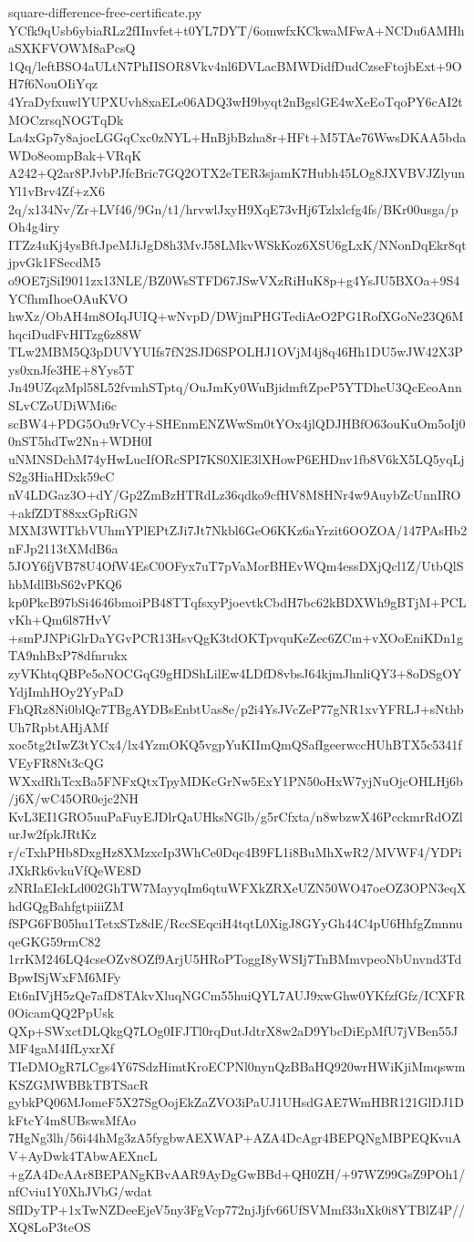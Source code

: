 \documentclass[11pt]{article}
\theoremstyle{definition}
\theoremstyle{remark}
\begin{document}
\begin{filecontents*}[overwrite]{square-difference-free-certificate.py}
YCfk9qUsb6ybiaRLz2fIInvfet+t0YL7DYT/6omwfxKCkwaMFwA+NCDu6AMHhaSXKFVOWM8aPcsQ
1Qq/leftBSO4aULtN7PhIISOR8Vkv4nl6DVLacBMWDidfDudCzseFtojbExt+9OH7f6NouOIiYqz
4YraDyfxuwlYUPXUvh8xaELe06ADQ3wH9byqt2nBgslGE4wXeEoTqoPY6cAI2tMOCzrsqNOGTqDk
La4xGp7y8ajocLGGqCxc0zNYL+HnBjbBzha8r+HFt+M5TAe76WwsDKAA5bdaWDo8eompBak+VRqK
A242+Q2ar8PJvbPJfcBric7GQ2OTX2eTER3sjamK7Hubh45LOg8JXVBVJZlyunYl1vBrv4Zf+zX6
2q/x134Nv/Zr+LVf46/9Gn/t1/hrvwlJxyH9XqE73vHj6Tzlxlcfg4fs/BKr00usga/pOh4g4iry
ITZz4uKj4ysBftJpeMJiJgD8h3MvJ58LMkvWSkKoz6XSU6gLxK/NNonDqEkr8qtjpvGk1FSecdM5
o9OE7jSiI9011zx13NLE/BZ0WsSTFD67JSwVXzRiHuK8p+g4YsJU5BXOa+9S4YCfhmIhoeOAuKVO
hwXz/ObAH4m8OIqJUIQ+wNvpD/DWjmPHGTediAeO2PG1RofXGoNe23Q6MhqciDudFvHITzg6z88W
TLw2MBM5Q3pDUVYUIfs7fN2SJD6SPOLHJ1OVjM4j8q46Hh1DU5wJW42X3Pys0xnJfe3HE+8Yys5T
Jn49UZqzMpl58L52fvmhSTptq/OuJmKy0WuBjidmftZpeP5YTDheU3QcEeoAnnSLvCZoUDiWMi6c
scBW4+PDG5Ou9rVCy+SHEnmENZWwSm0tYOx4jlQDJHBfO63ouKuOm5oIj00nST5hdTw2Nn+WDH0I
uNMNSDchM74yHwLucIfORcSPI7KS0XlE3lXHowP6EHDnv1fb8V6kX5LQ5yqLjS2g3HiaHDxk59cC
nV4LDGaz3O+dY/Gp2ZmBzHTRdLz36qdko9cfHV8M8HNr4w9AuybZcUnnIRO+akfZDT88xxGpRiGN
MXM3WITkbVUhmYPlEPtZJi7Jt7Nkbl6GeO6KKz6aYrzit6OOZOA/147PAsHb2nFJp2113tXMdB6a
5JOY6fjVB78U4OfW4EsC0OFyx7uT7pVaMorBHEvWQm4essDXjQcl1Z/UtbQlShbMdlBbS62vPKQ6
kp0PkcB97bSi4646bmoiPB48TTqfsxyPjoevtkCbdH7bc62kBDXWh9gBTjM+PCLvKh+Qm6l87HvV
+smPJNPiGlrDaYGvPCR13HsvQgK3tdOKTpvquKeZec6ZCm+vXOoEniKDn1gTA9nhBxP78dfnrukx
zyVKhtqQBPe5oNOCGqG9gHDShLilEw4LDfD8vbsJ64kjmJhnliQY3+8oDSgOYYdjImhHOy2YyPaD
FhQRz8Ni0blQc7TBgAYDBsEnbtUas8e/p2i4YsJVcZeP77gNR1xvYFRLJ+sNthbUh7RpbtAHjAMf
xoc5tg2tIwZ3tYCx4/lx4YzmOKQ5vgpYuKIImQmQSafIgeerwccHUhBTX5c5341fVEyFR8Nt3cQG
WXxdRhTcxBa5FNFxQtxTpyMDKcGrNw5ExY1PN50oHxW7yjNuOjcOHLHj6b/j6X/wC45OR0ejc2NH
KvL3EI1GRO5uuPaFuyEJDlrQaUHksNGlb/g5rCfxta/n8wbzwX46PcckmrRdOZlurJw2fpkJRtKz
r/cTxhPHb8DxgHz8XMzxcIp3WhCe0Dqc4B9FL1i8BuMhXwR2/MVWF4/YDPiJXkRk6vkuVfQeWE8D
zNRIaEIckLd002GhTW7MayyqIm6qtuWFXkZRXeUZN50WO47oeOZ3OPN3eqXhdGQgBahfgtpiiiZM
fSPG6FB05hu1TetxSTz8dE/RccSEqciH4tqtL0XigJ8GYyGh44C4pU6HhfgZmnnuqeGKG59rmC82
1rrKM246LQ4cseOZv8OZf9ArjU5HRoPToggI8yWSIj7TnBMmvpeoNbUnvnd3TdBpwISjWxFM6MFy
Et6nIVjH5zQe7afD8TAkvXluqNGCm55huiQYL7AUJ9xwGhw0YKfzfGfz/ICXFR0OicamQQ2PpUsk
QXp+SWxctDLQkgQ7LOg0IFJTl0rqDutJdtrX8w2aD9YbcDiEpMfU7jVBen55JMF4gaM4IfLyxrXf
TIeDMOgR7LCgs4Y67SdzHimtKroECPNl0nynQzBBaHQ920wrHWiKjiMmqswmKSZGMWBBkTBTSacR
gybkPQ06MJomeF5X27SgOojEkZaZVO3iPaUJ1UHsdGAE7WmHBR121GlDJ1DkFtcY4m8UBswsMfAo
7HgNg3lh/56i44hMg3zA5fygbwAEXWAP+AZA4DcAgr4BEPQNgMBPEQKvuAV+AyDwk4TAbwAEXncL
+gZA4DcAAr8BEPANgKBvAAR9AyDgGwBBd+QH0ZH/+97WZ99GsZ9POh1/nfCviu1Y0XhJVbG/wdat
SfIDyTP+1xTwNZDeeEjeV5ny3FgVcp772njJjfv66UfSVMmf33uXk0i8YTBlZ4P//XQ8LoP3teOS

\end{filecontents*}
\end{document}
